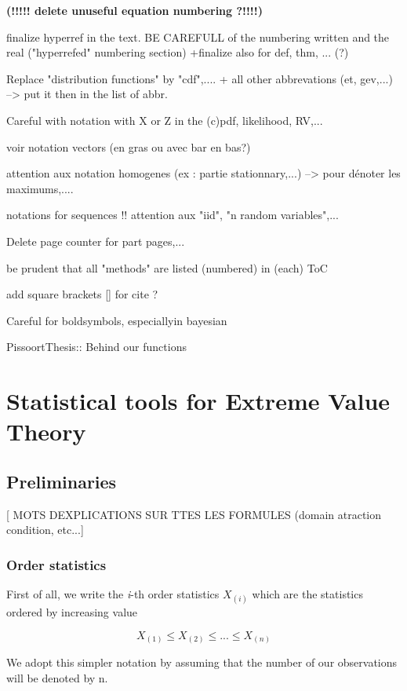 \documentclass[11pt,a4paper,openany ]{book}
\begin{document}
\textbf{(!!!!! delete unuseful equation numbering ?!!!!)}

finalize hyperref in the text. BE CAREFULL of the numbering written and the real ("hyperrefed" numbering section)
+finalize also for def, thm, ... (?)

Replace "distribution functions" by "cdf",....  + all other abbrevations (et, gev,...) --> put it then in the list of abbr.

Careful with notation with X or Z in the (c)pdf, likelihood, RV,...

voir notation vectors (en gras ou avec bar en bas?)

attention aux notation homogenes (ex : partie stationnary,...) --> pour dénoter les 
maximums,....

notations for sequences !! attention aux "iid", "n random variables",... 

Delete page counter for part pages,...

be prudent that all "methods" are listed (numbered) in (each) ToC

add square brackets [] for cite ? 

Careful for boldsymbols, especiallyin bayesian

PissoortThesis:: Behind our functions 




\appendix
\chapter{Statistical tools for Extreme Value Theory}\label{appA}

\section{Preliminaries}
[ MOTS DEXPLICATIONS SUR TTES LES FORMULES (domain atraction condition, etc...]

\subsection*{Order statistics}
First of all, we write the \emph{i}-th order statistics $X_{(i)} $ which are the statistics ordered by increasing value 

\begin{equation} \label{ordereds}
X_{(1)}\leq X_{(2)}\leq ...\leq X_{(n)}
\end{equation}

We adopt this simpler notation by assuming that the number of our observations will %
be denoted by n. 
\end{document}
